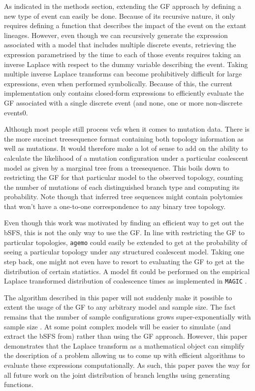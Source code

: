 \documentclass[10pt, a4]{article}
\begin{document}
As indicated in the methods section, extending the GF approach by defining a new type of event can easily be done. Because of its recursive nature, it only requires defining a function that describes the impact of the event on the extant lineages. However, even though we can recursively generate the expression associated with a model that includes multiple discrete events, retrieving the expression parametrised by the time to each of those events requires taking an inverse Laplace with respect to the dummy variable describing the event. Taking multiple inverse Laplace transforms can become prohibitively difficult for large expressions, even when performed symbolically. Because of this, the current implementation only contains closed-form expressions to efficiently evaluate the GF associated with a single discrete event (and none, one or more non-discrete events0.

Although most people still process vcfs when it comes to mutation data. There is the more succinct treesequence format containing both topology information as well as mutations. It would therefore make a lot of sense to add on the ability to calculate the likelihood of a mutation configuration under a particular coalescent model as given by a marginal tree from a treesequence. This boils down to restricting the GF for that particular model to the observed topology, counting the number of mutations of each distinguished branch type and computing its probability. Note though that inferred tree sequences might contain polytomies that won't have a one-to-one correspondence to any binary tree topology.  

Even though this work was motivated by finding an efficient way to get out the bSFS, this is not the only way to use the GF. In line with restricting the GF to particular topologies, \texttt{agemo} could easily be extended to get at the probability of seeing a particular topology under any structured coalescent model. Taking one step back, one might not even have to resort to evaluating the GF to get at the distribution of certain statistics. A model fit could be performed on the empirical Laplace transformed distribution of coalescence times as implemented in \texttt{MAGIC} \citep{Weissman2017}.

The algorithm described in this paper will not suddenly make it possible to extent the usage of the GF to any arbitrary model and sample size. The fact remains that the number of sample configurations grows super-exponentially with sample size \citep{Lohse2016}. At some point complex models will be easier to simulate (and extract the bSFS from) rather than using the GF approach. However, this paper demonstrates that the Laplace transform as a mathematical object can simplify the description of a problem allowing us to come up with efficient algorithms to evaluate these expressions computationally. As such, this paper paves the way for all future work on the joint distribution of branch lengths using generating functions.
 
\end{document}
